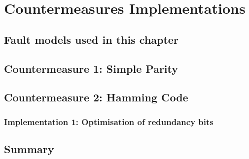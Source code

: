\chapter{Countermeasures Implementations}
\label{chapter:countermeasures}
\minitoc

\section{Fault models used in this chapter}


\section{Countermeasure 1: Simple Parity}


\section{Countermeasure 2: Hamming Code}

    \subsection{Implementation 1: Optimisation of redundancy bits}

\section{Summary}

